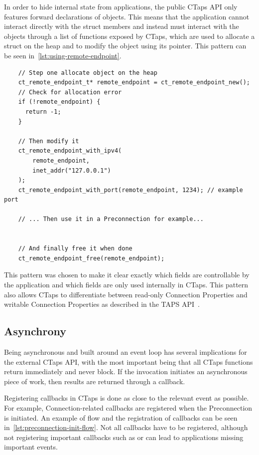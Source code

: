 In order to hide internal state from applications, the public CTaps API only
features forward declarations of objects. This means that the application
cannot interact directly with the struct members and instead must
interact with the objects through a list of functions exposed by CTaps,
which are used to allocate a struct on the heap and to modify the object using
its pointer. This pattern can be seen in~\cref{lst:using-remote-endpoint}.

\begin{listing}[htbp]
\begin{verbatim}
    // Step one allocate object on the heap
    ct_remote_endpoint_t* remote_endpoint = ct_remote_endpoint_new();
    // Check for allocation error
    if (!remote_endpoint) {
      return -1;
    }

    // Then modify it
    ct_remote_endpoint_with_ipv4(
        remote_endpoint,
        inet_addr("127.0.0.1")
    );
    ct_remote_endpoint_with_port(remote_endpoint, 1234); // example port

    // ... Then use it in a Preconnection for example...


    // And finally free it when done
    ct_remote_endpoint_free(remote_endpoint);
\end{verbatim} 
\caption[Remote Endpoint lifetime snippet]
{
    A snippet displaying how an application could manage
    the lifetime of a Remote Endpoint. Allocating on the
    heap and freeing when no longer needed.
}
\label{lst:using-remote-endpoint}
\end{listing}

This pattern was chosen to make it clear exactly which fields are
controllable by the application and which fields are only used internally in CTaps.
This pattern also allows CTaps to differentiate between read-only Connection Properties and writable
Connection Properties as described in the TAPS API~\cite[sec. 8.1.11]{rfc9622}.

\subsection{Asynchrony} \label{asynchrony}
Being asynchronous and built around an event loop has
several implications for the external CTaps API, with the most important being
that all CTaps functions return immediately and never block. If the invocation
initiates an asynchronous piece of work, then results are returned
through a callback.

Registering callbacks in CTaps is done as close
to the relevant event as possible. For example, Connection-related callbacks 
are registered when the Preconnection is initiated. An example of flow
and the registration of callbacks can be seen in~\cref{lst:preconnection-init-flow}.
Not all callbacks have to be registered, although not registering important
callbacks such as  or  can lead 
to applications missing important events.

